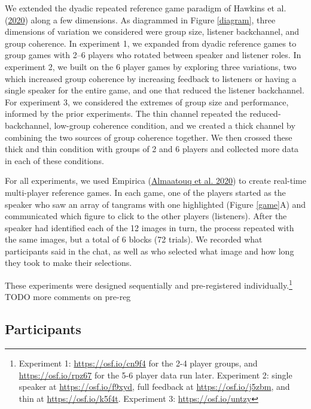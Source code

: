 \documentclass[
  english,
  a4paper,
]{article}
\begin{document}
We extended the dyadic repeated reference game paradigm of Hawkins et al. (\protect\hyperlink{ref-hawkinsCharacterizingDynamicsLearning2020}{2020}) along a few dimensions. As diagrammed in Figure \ref{diagram}, three dimensions of variation we considered were group size, listener backchannel, and group coherence. In experiment 1, we expanded from dyadic reference games to group games with 2--6 players who rotated between speaker and listener roles. In experiment 2, we built on the 6 player games by exploring three variations, two which increased group coherence by increasing feedback to listeners or having a single speaker for the entire game, and one that reduced the listener backchannel. For experiment 3, we considered the extremes of group size and performance, informed by the prior experiments. The thin channel repeated the reduced-backchannel, low-group coherence condition, and we created a thick channel by combining the two sources of group coherence together. We then crossed these thick and thin condition with groups of 2 and 6 players and collected more data in each of these conditions.

For all experiments, we used Empirica (\protect\hyperlink{ref-almaatouqEmpiricaVirtualLab2020}{Almaatouq et al. 2020}) to create real-time multi-player reference games. In each game, one of the players started as the speaker who saw an array of tangrams with one highlighted (Figure \ref{game}A) and communicated which figure to click to the other players (listeners). After the speaker had identified each of the 12 images in turn, the process repeated with the same images, but a total of 6 blocks (72 trials). We recorded what participants said in the chat, as well as who selected what image and how long they took to make their selections.

These experiments were designed sequentially and pre-registered individually.\footnote{Experiment 1: \url{https://osf.io/cn9f4} for the 2-4 player groups, and \url{https://osf.io/rpz67} for the 5-6 player data run later. Experiment 2: single speaker at \url{https://osf.io/f9xyd}, full feedback at \url{https://osf.io/j5zbm}, and thin at \url{https://osf.io/k5f4t}. Experiment 3: \url{https://osf.io/untzy}} TODO more comments on pre-reg

\hypertarget{participants}{%
\subsection{Participants}\label{participants}}
\end{document}

